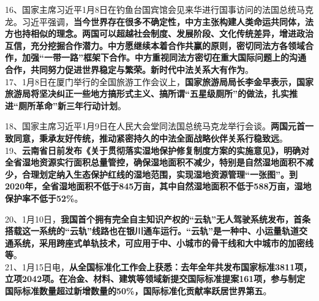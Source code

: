 16、国家主席习近平1月8日在钓鱼台国宾馆会见来华进行国事访问的法国总统马克龙。习近平强调，{\textbf{当今世界存在很多不确定性，中方主张构建人类命运共同体，法方也持相似的理念。两国可以超越社会制度、发展阶段、文化传统差异，增进政治互信，充分挖掘合作潜力。中方愿继续本着合作共赢的原则，密切同法方各领域合作，加强``一带一路''框架下合作。中方重视同法方密切在重大国际问题上的沟通合作，共同努力促进世界稳定与繁荣。新时代中法关系大有作为}}。\\
17、1月8日在厦门举行的全国旅游工作会议上，{\textbf{国家旅游局局长李金早表示，国家旅游局将坚决纠正一些地方搞形式主义、搞所谓``五星级厕所''的做法，扎实推进``厕所革命''新三年行动计划}}。

18、国家主席习近平1月9日在人民大会堂同法国总统马克龙举行会谈。{\textbf{两国元首一致同意，秉承友好传统，推动紧密持久的中法全面战略伙伴关系行稳致远}}。\\
19、{\textbf{云南省日前发布《关于贯彻落实湿地保护修复制度方案的实施意见》，明确对全省湿地资源实行面积总量管控，确保湿地面积不减少，特别是自然湿地面积不减少，合理划定纳入生态保护红线的湿地范围，实现湿地资源管理``一张图''。到2020年，全省湿地面积不低于845万亩，其中自然湿地面积不低于588万亩，湿地保护率不低于52\%}}。

20、1月10日，{\textbf{我国首个拥有完全自主知识产权的``云轨''无人驾驶系统发布，首条搭载这一系统的``云轨''线路也在银川通车运行。``云轨''是一种中、小运量轨道交通系统，采用跨座式单轨技术，可应用于中、小城市的骨干线和大中城市的加密线等}}。\\

21、1月15日电，{\textbf{从全国标准化工作会上获悉：去年全年共发布国家标准3811项，立项2042项。在冶金、材料、建筑等领域新提交国际标准提案161项，参与制定国际标准数量超过新增数量的50\%，国际标准化贡献率跃居世界第五}}。

